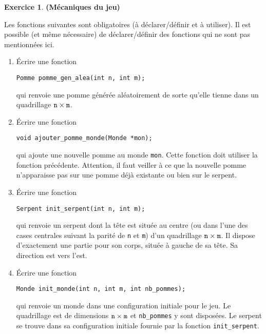 \documentclass[11pt]{article}
\theoremstyle{definition}
\newtheorem{Exercice}{Exercice}
\begin{document}
\begin{Exercice} {\bf (Mécaniques du jeu)}\smallskip

Les fonctions suivantes sont obligatoires (à déclarer/définir et à 
utiliser). Il est possible (et même nécessaire) de déclarer/définir des
fonctions qui ne sont pas mentionnées ici.
\smallskip

\begin{enumerate}
    \item Écrire une fonction
\begin{lstlisting}
Pomme pomme_gen_alea(int n, int m);
\end{lstlisting}
    qui renvoie une pomme générée aléatoirement de sorte qu'elle tienne
    dans un quadrillage ${\tt n} \times {\tt m}$.
    \smallskip

    \item Écrire une fonction
\begin{lstlisting}
void ajouter_pomme_monde(Monde *mon);
\end{lstlisting}
    qui ajoute une nouvelle pomme au monde {\tt mon}. Cette fonction
    doit utiliser la fonction précédente. Attention, il faut veiller
    à ce que la nouvelle pomme n'apparaisse pas sur une pomme déjà
    existante ou bien sur le serpent.
    \smallskip

    \item Écrire une fonction
\begin{lstlisting}
Serpent init_serpent(int n, int m);
\end{lstlisting}
    qui renvoie un serpent dont la tête est située au centre (ou dans
    l'une des cases centrales suivant la parité de {\tt n} et {\tt m})
    d'un quadrillage ${\tt n} \times {\tt m}$. Il dispose d'exactement
    une partie pour son corps, située à gauche de sa tête. Sa direction
    est vers l'est.
    \smallskip

    \item Écrire une fonction
\begin{lstlisting}
Monde init_monde(int n, int m, int nb_pommes);
\end{lstlisting}
    qui renvoie un monde dans une configuration initiale pour le jeu.
    Le quadrillage est de dimensions ${\tt n} \times {\tt m}$ et
    {\tt nb\_pommes} y sont disposées. Le serpent se trouve dans
    sa configuration initiale fournie par la fonction {\tt init\_serpent}.
    \smallskip


\end{enumerate}
\end{Exercice}
\end{document}
